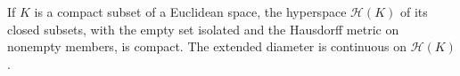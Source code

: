 If \(K\) is a compact subset of a Euclidean space, the hyperspace \(\mathcal H(K)\) of its closed subsets, with the empty set isolated and the Hausdorff metric on nonempty members, is compact.  The extended diameter is continuous on \(\mathcal H(K)\).